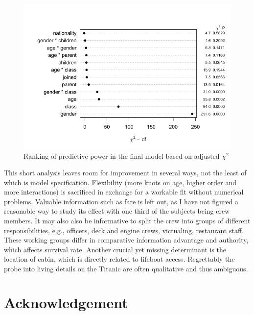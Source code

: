 \documentclass[]{interact}
\theoremstyle{plain}%
\theoremstyle{definition}
\theoremstyle{remark}
\begin{document}
\begin{figure}[H]

{\centering \includegraphics{titanic-survival_files/figure-latex/ftwo-anova-plot-1} 

}

\caption{Ranking of predictive power in the final model based on adjusted \(\chi^2\)}\label{fig:ftwo-anova-plot}
\end{figure}



This short analysis leaves room for improvement in several ways, not the least of which is model specification. Flexibility (more knots on age, higher order and more interactions) is sacrificed in exchange for a workable fit without numerical problems. Valuable information such as fare is left out, as I have not figured a reasonable way to study its effect with one third of the subjects being crew members. It may also also be informative to split the crew into groups of different responsibilities, e.g., officers, deck and engine crews, victualing, restaurant staff. These working groups differ in comparative information advantage and authority, which affects survival rate. Another crucial yet missing determinant is the location of cabin, which is directly related to lifeboat access. Regrettably the probe into living details on the Titanic are often qualitative and thus ambiguous.

\pagebreak

\hypertarget{appendix-appendix}{%
\appendix}


\hypertarget{acknowledgement}{%
\section{Acknowledgement}\label{acknowledgement}}
\end{document}
